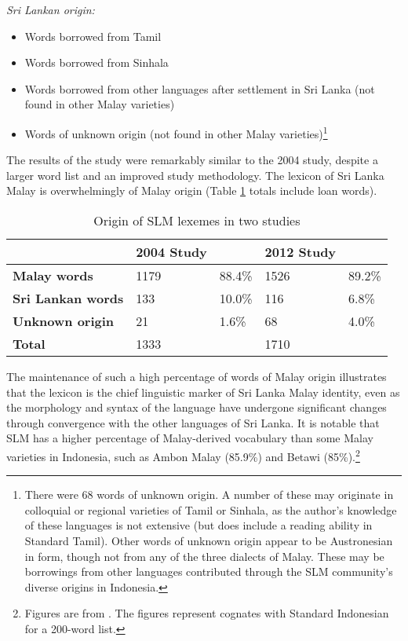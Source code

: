 \textit{Sri Lankan origin:}

\begin{itemize}
\item Words borrowed from Tamil

\item Words borrowed from Sinhala

\item Words borrowed from other languages after settlement in Sri Lanka (not found in other Malay varieties)

\item Words of unknown origin (not found in other Malay varieties)\footnote{There
 were 68 words of unknown origin. A number of these may originate in colloquial or regional varieties of Tamil or Sinhala, as the author's knowledge of these languages is not extensive (but does include a reading ability in Standard Tamil). Other words of unknown origin appear to be Austronesian in form, though not from any of the three dialects of Malay. These may be borrowings from other languages contributed through the SLM community's diverse origins in Indonesia. 
}
\end{itemize}


The results of the study were remarkably similar to the 2004 study, despite a larger word list and an improved study methodology. The lexicon of Sri Lanka Malay is overwhelmingly of Malay origin (Table \ref{paauw:tab:originsoflexemes} totals include loan words).

\begin{table}
\centering
\begin{tabular}{lllll}
 &
\textbf{2004 Study} &
 &
\textbf{2012 Study} &
\\\hline
\textbf{Malay words} &
1179 &
88.4\% &
1526 &
89.2\%\\
\textbf{Sri Lankan words} &
133 &
10.0\% &
116 &
 6.8\%\\
\textbf{Unknown origin} &
21 &
1.6\% &
68 &
 4.0\%\\\hline
\textbf{Total} &
1333 &
 &
1710 &
\\
\end{tabular}
\caption{Origin of SLM lexemes in two studies}
\label{paauw:tab:originsoflexemes}
\end{table}

The maintenance of such a high percentage of words of Malay origin illustrates that the lexicon is the chief linguistic marker of Sri Lanka Malay identity, even as the morphology and syntax of the language have undergone significant changes through convergence with the other languages of Sri Lanka. It is notable that SLM has a higher percentage of Malay-derived vocabulary than some Malay varieties in Indonesia, such as Ambon Malay (85.9\%) and Betawi (85\%).\footnote{Figures
 are from \citet[3]{Blust1988}. The figures represent cognates with Standard Indonesian for a 200-word list. 
}


